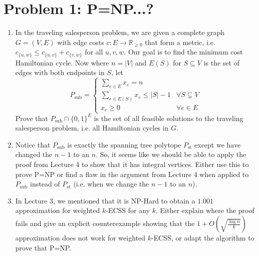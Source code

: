 

\renewcommand{\P}[1]{{\mathbb{P}}\left[#1\right]}
\renewcommand{\PP}[2]{{\mathbb{P}}_{#1}\left[#2\right]}
\renewcommand{\E}[1]{{\mathbb{E}}\left[#1\right]}
\renewcommand{\EE}[2]{{\mathbb{E}}_{#1}\left[#2\right]}
\renewcommand{\R}{\ensuremath{\mathbb R}}
\renewcommand{\Z}{\ensuremath{\mathbb Z}}
\def\cI{{\cal I}}



\noindent
   \begin{center}
   \end{center}


\section{Problem 1: P=NP...?} 

\begin{enumerate}
	\item In the traveling salesperson problem, we are given a complete graph $G=(V,E)$ with edge costs $c: E \to \R_{\ge 0}$ that form a metric, i.e. $c_{\{u,w\}} \le c_{\{u,v\}}+c_{\{v,w\}}$ for all $u,v,w$. Our goal is to find the minimum cost Hamiltonian cycle. Now where $n=|V|$ and $E(S)$ for $S \subseteq V$ is the set of edges with both endpoints in $S$, let $$P_{\mathrm{sub}} = \begin{cases} \sum_{e \in E} x_e = n \\ \sum_{e \in E(S)} x_e \le |S|-1 & \forall S \subsetneq V \\ x_e \ge 0 & \forall e \in E \end{cases}$$
	Prove that $P_{\mathrm{sub}} \cap \{0,1\}^E$ is the set of all feasible solutions to the traveling salesperson problem, i.e. all Hamiltonian cycles in $G$. 
	\item Notice that $P_{\mathrm{sub}}$ is exactly the spanning tree polytope $P_{\mathrm{st}}$ except we have changed the $n-1$ to an $n$. So, it seems like we should be able to apply the proof from Lecture 4 to show that it has integral vertices. Either use this to prove P=NP or find a flaw in the argument from Lecture 4 when applied to $P_{\mathrm{sub}}$ instead of $P_{\mathrm{st}}$ (i.e. when we change the $n-1$ to an $n$).
	\item In Lecture 3, we mentioned that it is NP-Hard to obtain a $1.001$ approximation for weighted $k$-ECSS for any $k$. Either explain where the proof fails and give an explicit counterexample showing that the $1+O(\sqrt{\frac{\log n}{k}})$ approximation does not work for weighted $k$-ECSS, or adapt the algorithm to prove that P=NP.  
\end{enumerate}

